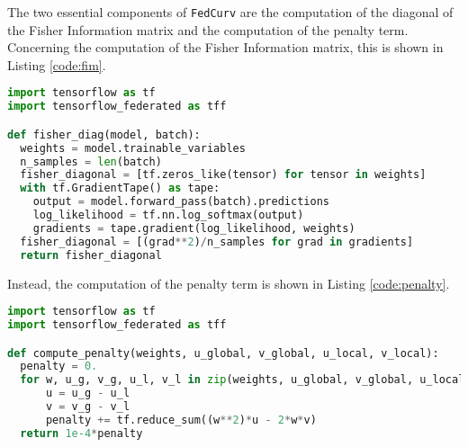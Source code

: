 The two essential components of \texttt{FedCurv} are the computation of the diagonal of the Fisher Information matrix and the computation of the penalty term. Concerning the computation of the Fisher Information matrix, this is shown in Listing \ref{code:fim}.


\begin{lstlisting}[caption={Code for the computation of the diagonal of the Fisher Information matrix.},label={code:fim},language=Python]
import tensorflow as tf
import tensorflow_federated as tff

def fisher_diag(model, batch):
  weights = model.trainable_variables
  n_samples = len(batch)
  fisher_diagonal = [tf.zeros_like(tensor) for tensor in weights]
  with tf.GradientTape() as tape:
    output = model.forward_pass(batch).predictions
    log_likelihood = tf.nn.log_softmax(output)
    gradients = tape.gradient(log_likelihood, weights)
  fisher_diagonal = [(grad**2)/n_samples for grad in gradients]
  return fisher_diagonal
\end{lstlisting}


Instead, the computation of the penalty term is shown in Listing \ref{code:penalty}.


\begin{lstlisting}[caption={Code for the computation of the penalty term.},label={code:penalty},language=Python]
import tensorflow as tf
import tensorflow_federated as tff

def compute_penalty(weights, u_global, v_global, u_local, v_local):
  penalty = 0.
  for w, u_g, v_g, u_l, v_l in zip(weights, u_global, v_global, u_local, v_local):
      u = u_g - u_l
      v = v_g - v_l
      penalty += tf.reduce_sum((w**2)*u - 2*w*v)
  return 1e-4*penalty
\end{lstlisting}